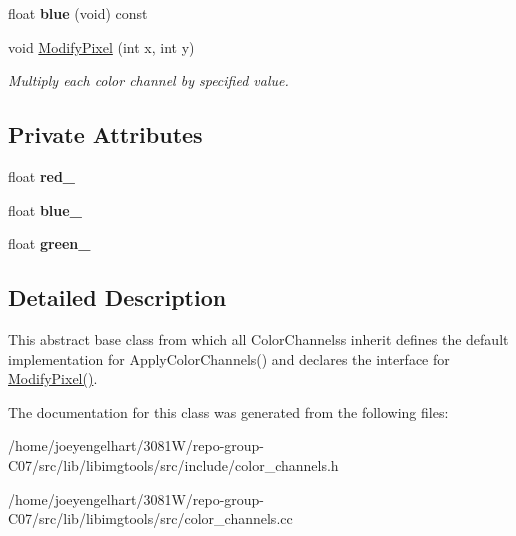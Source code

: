 \begin{DoxyCompactItemize}
\item 
float {\bfseries blue} (void) const \hypertarget{classimage__tools_1_1ColorChannels_a45791e88f05f5770d07ad4169e4ae9c4}{}\label{classimage__tools_1_1ColorChannels_a45791e88f05f5770d07ad4169e4ae9c4}

\item 
void \hyperlink{classimage__tools_1_1ColorChannels_ac97f5bae865b5fe1f04306fe0f41d3b9}{Modify\+Pixel} (int x, int y)\hypertarget{classimage__tools_1_1ColorChannels_ac97f5bae865b5fe1f04306fe0f41d3b9}{}\label{classimage__tools_1_1ColorChannels_ac97f5bae865b5fe1f04306fe0f41d3b9}

\begin{DoxyCompactList}\small\item\em Multiply each color channel by specified value. \end{DoxyCompactList}\end{DoxyCompactItemize}
\subsection*{Private Attributes}
\begin{DoxyCompactItemize}
\item 
float {\bfseries red\+\_\+}\hypertarget{classimage__tools_1_1ColorChannels_a606500472c5a663e714f2374cc45716d}{}\label{classimage__tools_1_1ColorChannels_a606500472c5a663e714f2374cc45716d}

\item 
float {\bfseries blue\+\_\+}\hypertarget{classimage__tools_1_1ColorChannels_a0eb688bcbff520f3994dfb7654ac5caa}{}\label{classimage__tools_1_1ColorChannels_a0eb688bcbff520f3994dfb7654ac5caa}

\item 
float {\bfseries green\+\_\+}\hypertarget{classimage__tools_1_1ColorChannels_a82a5c441e079e280031509107422c685}{}\label{classimage__tools_1_1ColorChannels_a82a5c441e079e280031509107422c685}

\end{DoxyCompactItemize}


\subsection{Detailed Description}
This abstract base class from which all Color\+Channelss inherit defines the default implementation for Apply\+Color\+Channels() and declares the interface for \hyperlink{classimage__tools_1_1ColorChannels_ac97f5bae865b5fe1f04306fe0f41d3b9}{Modify\+Pixel()}. 

The documentation for this class was generated from the following files\+:\begin{DoxyCompactItemize}
\item 
/home/joeyengelhart/3081\+W/repo-\/group-\/\+C07/src/lib/libimgtools/src/include/color\+\_\+channels.\+h\item 
/home/joeyengelhart/3081\+W/repo-\/group-\/\+C07/src/lib/libimgtools/src/color\+\_\+channels.\+cc\end{DoxyCompactItemize}
